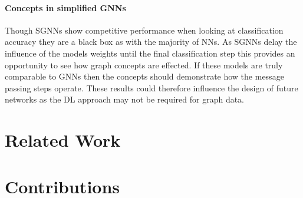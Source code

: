 \paragraph{Concepts in simplified GNNs}
Though SGNNs show competitive performance when looking at classification accuracy they are a black box as with the majority of NNs.
As SGNNs delay the influence of the models weights until the final classification step this provides an opportunity to see how graph concepts are effected.
If these models are truly comparable to GNNs then the concepts should demonstrate how the message passing steps operate.
These results could therefore influence the design of future networks as the DL approach may not be required for graph data. 



\section{Related Work}














\section{Contributions}

